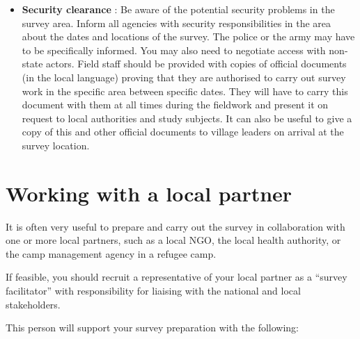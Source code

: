 \documentclass[12pt,a4paper]{book}
\begin{document}
\begin{itemize}
\item
  \textbf{Security clearance} : Be aware of the potential security problems in the survey area. Inform all agencies with security responsibilities in the area about the dates and locations of the survey. The police or the army may have to be specifically informed. You may also need to negotiate access with non-state actors. Field staff should be provided with copies of official documents (in the local language) proving that they are authorised to carry out survey work in the specific area between specific dates. They will have to carry this document with them at all times during the fieldwork and present it on request to local authorities and study subjects. It can also be useful to give a copy of this and other official documents to village leaders on arrival at the survey location.
\end{itemize}

\hypertarget{working-with-a-local-partner}{%
\section{Working with a local partner}\label{working-with-a-local-partner}}

It is often very useful to prepare and carry out the survey in collaboration with one or more local partners, such as a local NGO, the local health authority, or the camp management agency in a refugee camp.

If feasible, you should recruit a representative of your local partner as a ``survey facilitator'' with responsibility for liaising with the national and local stakeholders.

This person will support your survey preparation with the following:
\end{document}
